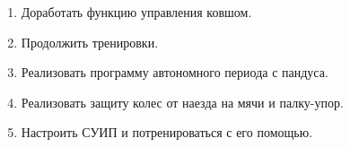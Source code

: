 \begin{enumerate}
\begin{enumerate}
		\item Доработать функцию управления ковшом.
		
		\item Продолжить тренировки.
		
        \item Реализовать программу автономного периода с пандуса.
        
        \item Реализовать защиту колес от наезда на мячи и палку-упор.
        
        \item Настроить СУИП и потренироваться с его помощью.
			
	\end{enumerate}
\end{enumerate}
\fillpage
